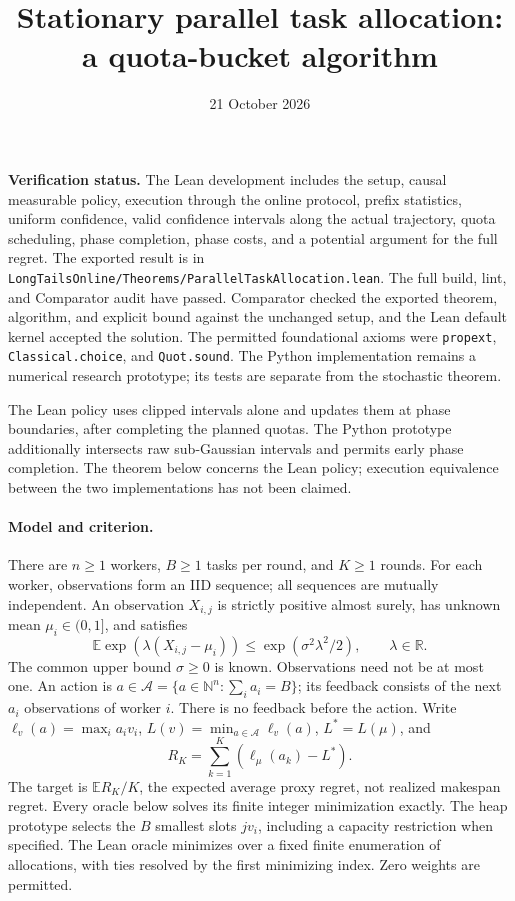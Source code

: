 \documentclass[11pt]{article}
\title{Stationary parallel task allocation: a quota-bucket algorithm}
\author{}
\date{21 October 2026}
\newcommand{\R}{\mathbb R}
\newcommand{\E}{\mathbb E}
\newcommand{\A}{\mathcal A}
\begin{document}
\maketitle
\noindent\textbf{Verification status.}
The Lean development includes the setup, causal measurable policy, execution
through the online protocol, prefix statistics, uniform confidence, valid
confidence intervals along the actual trajectory, quota scheduling, phase
completion, phase costs, and a potential argument for the full regret.
The exported result is in
\texttt{LongTailsOnline/Theorems/ParallelTaskAllocation.lean}.
The full build, lint, and Comparator audit have passed. Comparator checked
the exported theorem, algorithm, and explicit bound against the unchanged
setup, and the Lean default kernel accepted the solution. The permitted
foundational axioms were \texttt{propext}, \texttt{Classical.choice}, and
\texttt{Quot.sound}.
The Python implementation remains a numerical research prototype; its tests
are separate from the stochastic theorem.

The Lean policy uses clipped intervals alone and updates them at phase boundaries,
after completing the planned quotas. The Python prototype additionally intersects
raw sub-Gaussian intervals and permits early phase completion. The theorem below
concerns the Lean policy; execution equivalence between the two implementations
has not been claimed.

\paragraph{Model and criterion.}
There are $n\ge1$ workers, $B\ge1$ tasks per round, and $K\ge1$ rounds.
For each worker, observations form an IID sequence; all sequences are mutually
independent. An observation $X_{i,j}$ is strictly positive almost surely, has
unknown mean $\mu_i\in(0,1]$, and satisfies
\[
 \E\exp(\lambda(X_{i,j}-\mu_i))\le\exp(\sigma^2\lambda^2/2),\qquad\lambda\in\R.
\]
The common upper bound $\sigma\ge0$ is known. Observations need not be at most one.
An action is $a\in\A=\{a\in\mathbb N^n:\sum_i a_i=B\}$; its feedback consists of
the next $a_i$ observations of worker $i$. There is no feedback before the action.
Write $\ell_v(a)=\max_i a_i v_i$,
$L(v)=\min_{a\in\A}\ell_v(a)$, $L^*=L(\mu)$, and
\[
 R_K=\sum_{k=1}^K(\ell_\mu(a_k)-L^*).
\]
The target is $\E R_K/K$, the expected average proxy regret, not realized makespan regret.
Every oracle below solves its finite integer minimization exactly. The heap
prototype selects the $B$ smallest slots $jv_i$, including a capacity restriction
when specified. The Lean oracle minimizes over a fixed finite enumeration of
allocations, with ties resolved by the first minimizing index. Zero weights are permitted.
\end{document}

